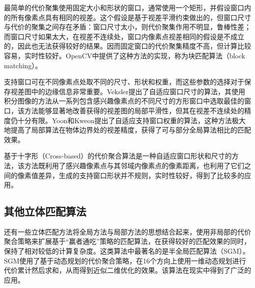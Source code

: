 最简单的代价聚集使用固定大小和形状的窗口，通常使用一个矩形，并假设窗口内的所有像素点具有相同的视差。这个假设是基于视差平滑约束做出的，但窗口尺寸与代价的聚集之间存在矛盾：窗口尺寸太小，则代价聚集作用不明显，鲁棒性差；而窗口尺寸如果太大，在视差不连续处，窗口内像素点视差相同的假设是不成立的，因此也无法获得较好的结果。因而固定窗口的代价聚集精度不高，但计算比较容易，实时性较好。OpenCV中提供了这种方法的实现，称为块匹配算法（block matching）。

支持窗口可在不同像素点处取不同的尺寸、形状和权重，而这些参数的选择对于保存视差图中的边缘信息非常重要。Veksler\cite{veksler2003fast}提出了自适应窗口尺寸的算法，其使用积分图像的方法从一系列包含感兴趣像素点的不同尺寸的方形窗口中选取最佳的窗口，该方法能够显著地改善获得的视差图的局部平滑性，但其在视差不连续处的精度仍十分有限。Yoon和Kweon\cite{yoon2005locally}提出了自适应支持窗口权重的算法，这种方法极大地提高了局部算法在物体边界处的视差精度，获得了可与部分全局算法相比的匹配效果。

基于十字形（Cross-based）的代价聚合算法\cite{zhang2009cross}是一种自适应窗口形状和尺寸的方法，该方法既利用了感兴趣像素点与其邻域内像素点的像素距离，也利用了它们之间的像素值差异，生成的支持窗口形状并不规则，实时性较好，得到了比较多的应用。
\subsection{其他立体匹配算法}
还有一些立体匹配方法将全局方法与局部方法的思想结合起来，使用非局部的代价聚合策略来扩展基于“赢者通吃”策略的匹配算法，在获得较好的匹配效果的同时，保持了相对较低的计算复杂度。这类算法中最著名的是半全局匹配算法（SGM）\cite{Hirschmuller08}。SGM使用了基于动态规划的代价聚合策略，在16个方向上使用一维动态规划进行代价累计然后求和，从而得到近似二维优化的效果。该算法在现实中得到了广泛的应用。


%




